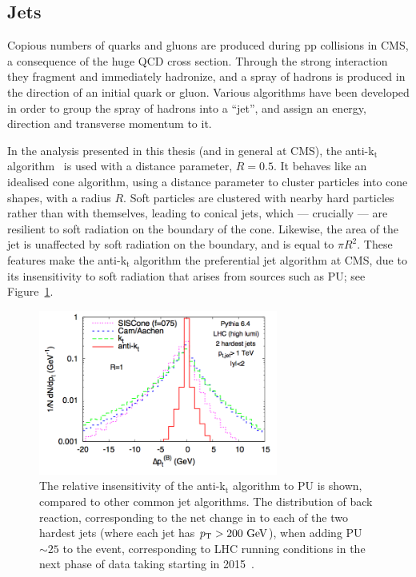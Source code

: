 \subsection{Jets}
Copious numbers of quarks and gluons are produced during pp collisions in \ac{CMS}, a consequence of the huge \ac{QCD} cross section.
Through the strong interaction they fragment and immediately hadronize, and a spray of hadrons is produced in the direction of an initial quark or gluon.
Various algorithms have been developed in order to group the spray of hadrons into a ``jet'', and assign an energy, direction and transverse momentum to it.

In the analysis presented in this thesis (and in general at \ac{CMS}), the anti-k$_{\mathrm{t}}$ algorithm~\cite{bib:akjets} is used with a distance parameter, $R = 0.5$.
It behaves like an idealised cone algorithm, using a distance parameter to cluster particles into cone shapes, with a radius $R$. Soft particles are clustered with nearby hard particles rather than with themselves, leading to conical jets, which --- crucially --- are resilient to soft radiation on the boundary of the cone.
Likewise, the area of the jet is unaffected by soft radiation on the boundary, and is equal to $\pi R^{2}$. 
These features make the anti-k$_{\mathrm{t}}$ algorithm the preferential jet algorithm at \ac{CMS}, due to its insensitivity to soft radiation that arises from sources such as \ac{PU}; see Figure~\ref{fig:antikT_PU}. 

\begin{figure}[htbp]
  \begin{center}
  \includegraphics[width=0.7\textwidth]{Figures/detector/PUantiKT}
  \caption{The relative insensitivity of the anti-k$_{\mathrm{t}}$ algorithm to \ac{PU} is shown, compared to other common jet algorithms. The distribution of back reaction, corresponding to the net change in \pt to each of the two hardest jets (where each jet has $p_{\text{T}}>200~\mathrm{GeV}$), when adding \ac{PU}$\sim 25$ to the event, corresponding to \ac{LHC} running conditions in the next phase of data taking starting in 2015~\cite{bib:akjets}.}
  \label{fig:antikT_PU}
  \end{center}
\end{figure}

